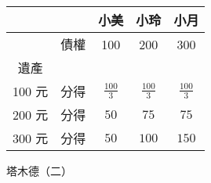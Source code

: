 \begin{center}
\hfill
\begin{tabular}{cc|ccc}
	\toprule
	& & 小美 & 小玲 & 小月 \\
	\hline
		   & 債權 & 100           & 200           & 300           \\
	遺產   &      &               &               &               \\
	100 元 & 分得 & $\frac{100}3$ & $\frac{100}3$ & $\frac{100}3$ \\
	200 元 & 分得 & $50$          & $75$          & $75$          \\
	300 元 & 分得 & $50$          & $100$         & $150$         \\
	\bottomrule
\end{tabular}
\hfill\textsf{\small{塔木德（二）}}
\end{center}
